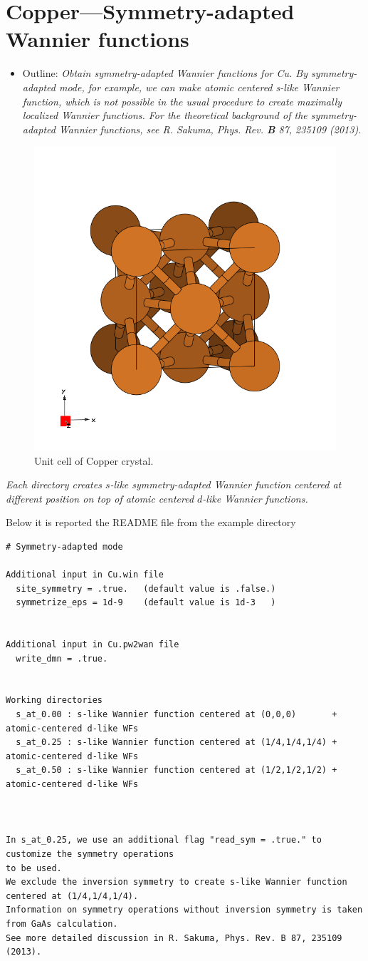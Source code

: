 \section{Copper---Symmetry-adapted Wannier functions}
\label{sec22:CopperSA}

\begin{itemize}
	\item Outline: {\it Obtain symmetry-adapted Wannier functions for Cu. By symmetry-adapted mode, for
example, we can make atomic centered s-like Wannier function, which is not possible in the usual
procedure to create maximally localized Wannier functions. For the theoretical background of the
symmetry-adapted Wannier functions, see R. Sakuma, Phys. Rev. \textbf{B} 87, 235109 (2013).}
\end{itemize}

\begin{figure}[h!]
\centering
\includegraphics[width=0.25\columnwidth,trim={45pt 45pt 55pt 55pt},clip]{figure/example04/copper_crystal.png}
\caption{Unit cell of Copper crystal.}
\label{fig22.0}
\end{figure}

{\it Each directory creates $s$-like symmetry-adapted Wannier function centered at different position on top
of atomic centered $d$-like Wannier functions.}

Below it is reported the README file from the example directory

\begin{tcolorbox}
{\footnotesize 
\begin{verbatim}
# Symmetry-adapted mode

Additional input in Cu.win file 
  site_symmetry = .true.   (default value is .false.) 
  symmetrize_eps = 1d-9    (default value is 1d-3   )


Additional input in Cu.pw2wan file 
  write_dmn = .true.


Working directories 
  s_at_0.00 : s-like Wannier function centered at (0,0,0)       + atomic-centered d-like WFs  
  s_at_0.25 : s-like Wannier function centered at (1/4,1/4,1/4) + atomic-centered d-like WFs  
  s_at_0.50 : s-like Wannier function centered at (1/2,1/2,1/2) + atomic-centered d-like WFs 



In s_at_0.25, we use an additional flag "read_sym = .true." to customize the symmetry operations 
to be used.  
We exclude the inversion symmetry to create s-like Wannier function centered at (1/4,1/4,1/4). 
Information on symmetry operations without inversion symmetry is taken from GaAs calculation. 
See more detailed discussion in R. Sakuma, Phys. Rev. B 87, 235109 (2013). 
\end{verbatim}
}
\end{tcolorbox}

